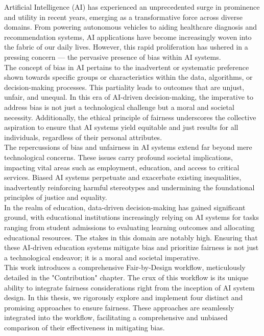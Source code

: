 \documentclass[12pt,a4paper,openright,twoside]{book}
\begin{document}
Artificial Intelligence (AI) has experienced an unprecedented surge in prominence and utility in recent years, emerging as a transformative force across diverse domains. From powering autonomous vehicles to aiding healthcare diagnosis and recommendation systems, AI applications have become increasingly woven into the fabric of our daily lives. However, this rapid proliferation has ushered in a pressing concern — the pervasive presence of bias within AI systems. \\
The concept of bias in AI pertains to the inadvertent or systematic preference shown towards specific groups or characteristics within the data, algorithms, or decision-making processes. This partiality leads to outcomes that are unjust, unfair, and unequal. In this era of AI-driven decision-making, the imperative to address bias is not just a technological challenge but a moral and societal necessity. Additionally, the ethical principle of fairness underscores the collective aspiration to ensure that AI systems yield equitable and just results for all individuals, regardless of their personal attributes. \\
The repercussions of bias and unfairness in AI systems extend far beyond mere technological concerns. These issues carry profound societal implications, impacting vital areas such as employment, education, and access to critical services. Biased AI systems perpetuate and exacerbate existing inequalities, inadvertently reinforcing harmful stereotypes and undermining the foundational principles of justice and equality. \\
In the realm of education, data-driven decision-making has gained significant ground, with educational institutions increasingly relying on AI systems for tasks ranging from student admissions to evaluating learning outcomes and allocating educational resources. The stakes in this domain are notably high. Ensuring that these AI-driven education systems mitigate bias and prioritize fairness is not just a technological endeavor; it is a moral and societal imperative. \\
This work introduces a comprehensive Fair-by-Design workflow, meticulously detailed in the "Contribution" chapter. The crux of this workflow is its unique ability to integrate fairness considerations right from the inception of AI system design. In this thesis, we rigorously explore and implement four distinct and promising approaches to ensure fairness. These approaches are seamlessly integrated into the workflow, facilitating a comprehensive and unbiased comparison of their effectiveness in mitigating bias. \\
\end{document}
